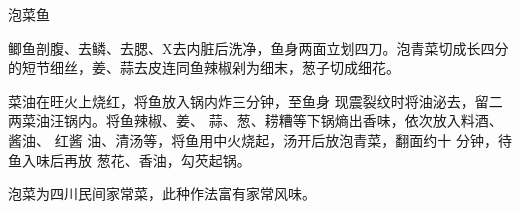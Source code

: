 \begin{recipe}{泡菜鱼}

\ingredients


\preparation

\step 鲫鱼剖腹、去鳞、去腮、X去内脏后洗净，鱼身两面立划四刀。泡青菜切成长四分
的短节细丝，姜、蒜去皮连同鱼辣椒剁为细末，葱子切成细花。

\step 菜油在旺火上烧红，将鱼放入锅内炸三分钟，至鱼身 现震裂纹时将油泌去，留二
两菜油汪锅内。将鱼辣椒、姜、 蒜、葱、耢糟等下锅熵出香味，依次放入料酒、酱油、
红酱 油、清汤等，将鱼用中火烧起，汤开后放泡青菜，翻面约十 分钟，待鱼入味后再放
葱花、香油，勾芡起锅。

\features

泡菜为四川民间家常菜，此种作法富有家常风味。

\end{recipe}

